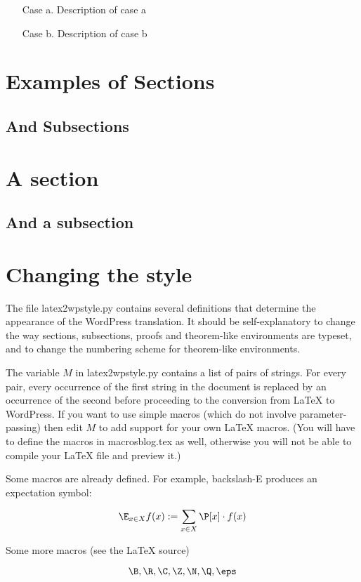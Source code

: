 \begin{itemize}
\item [Case a.] Description of case a
\item [Case b.] Description of case b
\end{itemize}

\section*{Examples of Sections}

\subsection*{And Subsections}

\section{A section}
\label{sec}

\subsection{And a subsection}

\section{Changing the style}

The file latex2wpstyle.py contains several definitions that determine
the appearance of the WordPress translation. It should be self-explanatory
to change the way sections, subsections, proofs and theorem-like
environments are typeset, and to change the numbering scheme
for theorem-like environments.

The variable $M$ in latex2wpstyle.py contains a list of pairs of strings.
For every pair, every occurrence of the first string in the document is
replaced by an occurrence of the second before proceeding to the
conversion from LaTeX to WordPress. If you want to use simple macros
(which do not involve parameter-passing) then edit $M$ to add support
for your own LaTeX macros. (You will have to define the macros in
macrosblog.tex as well, otherwise you will not be able to compile
your LaTeX file and preview it.)

Some macros are already defined. For example, backslash-E produces
an expectation symbol:

\[ \E_{x \in X} f(x) := \sum_{x\in X} \P [x] \cdot f(x) \]

Some more macros (see the LaTeX source)

\[ \B, \R , \C, \Z, \N , \Q,  \eps \]

